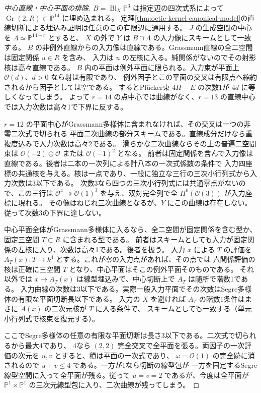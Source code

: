 \begin{proof}[中心直線・中心平面の排除]
$B=\operatorname{Bl}_X\mathbb P^3$ は指定辺の四次式系によって $\operatorname{Gr}(2,R)\subset\mathbb P^{14}$ に埋め込まれる。
定理\ref{thm:octic-kernel-canonical-model}の直線切断による埋込み証明は任意のこの有限辺に通用する。
$J$ の生成空間の中心を $\Lambda\simeq\mathbb P^{14-r}$ とすると、
$X$ の外で $Y$ は $B\cap\Lambda$ の入力像にスキームとして一致する。
$B$ の非例外直線からの入力像は直線である。Grassmann直線の全二空間は固定関係 $u\in R$ を含み、
入力は $u$ の左核に入る。純関係がないのでその射影核は高々直線である。
$B$ 内の平面は例外平面に限られる。入力束が平面上 $\mathcal O(d)$、$d>0$ なら射は有限であり、
例外因子とこの平面の交叉は有限点へ縮約されるから因子としては空である。
するとPlücker束 $4H-E$ の次数1が $4d$ に等しくなってしまう。
よって $r=14$ の点中心では曲線がなく、$r=13$ の直線中心では入力次数は高々1で下界に反する。

$r=12$ の平面中心がGrassmann多様体に含まれなければ、その交叉は一つの非零二次式で切られる
平面二次曲線の部分スキームである。直線成分だけなら重複度込みで入力次数は高々2である。
滑らかな二次曲線ならその上の普遍二空間束は $\mathcal O(-2)\oplus\mathcal O$ または $\mathcal O(-1)^2$ となる。
前者は固定関係を含んで入力像は直線である。後者は二本の一次列による計八本の一次式係数の条件で
入力四座標の共通核を与える。核は一点であり、一般に独立な三行の三次小行列式から入力次数は3以下である。
次数3なら四つの三次小行列式には共通零点がないので、この三行は
$\mathcal O^4\twoheadrightarrow\mathcal O(1)^3$ を与え、双対完全列で全 $H^0(\mathcal O(3))$ が入力座標に現れる。
その像はねじれ三次曲線となるが、$Y$ にこの曲線は存在しない。従って次数3の下界に達しない。

中心平面全体がGrassmann多様体に入るなら、全二空間が固定関係を含む型か、固定三空間 $T\subset R$ に含まれる型である。
前者はスキームとしても入力が固定関係の左核に入り、次数は高々1である。後者を扱う。
入力 $x$ による $T$ の評価を $A_T(x):T\to k^4$ とする。これが零の入力点があれば、その点では
六関係評価の核は正確に三空間 $T$ となり、中心平面はそこの例外平面そのものである。
それ以外では $x\mapsto A_T(x)$ は線型埋込みで、中心切断上で $A_T$ は随所で階数1である。
入力曲線の次数は3以下である。実際一般入力平面でその次数はSegre多様体の有限な平面切断長以下である。
入力の $X$ を避ければ $A_T$ の階数1条件はまさに $A(x)$ の二次元核が $T$ に入る条件で、
スキームとしても一致する（単元小行列式で核束を復元する）。

ここでSegre多様体の任意の有限な平面切断は長さ3以下である。二次式で切られるから最大4であり、
4なら $(2,2)$ 完全交叉で全平面を張る。両因子の一次評価の次元を $u,v$ とすると、積は平面の一次式であり、
$\omega=\mathcal O(1)$ の完全跡に消されるので $u+v\le4$ である。一方が1なら切断の線型包が
一方を固定するSegre線型空間に入って全平面が残る。従って $u=v=2$ であるが、今度は全平面が
$\mathbb P^1\times\mathbb P^1$ の三次元線型包に入り、二次曲線が残ってしまう。


\end{proof}
